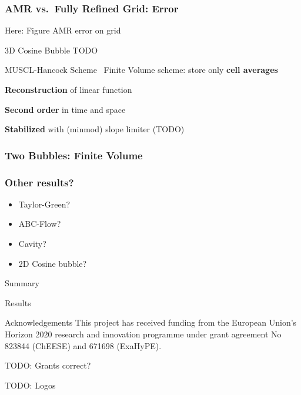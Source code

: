 \documentclass[aspectratio=169]{beamer}
\begin{document}
\begin{frame}
  \frametitle{AMR vs.\ Fully Refined Grid: Error}

  Here: Figure AMR error on grid
\end{frame}

\begin{frame}{3D Cosine Bubble}
  TODO
\end{frame}

\begin{frame}{MUSCL-Hancock Scheme~}
  Finite Volume scheme: store only \textbf{cell averages}

  \textbf{Reconstruction} of linear function

  \textbf{Second order} in time and space

  \textbf{Stabilized} with (minmod) slope limiter (TODO)
\end{frame}

\begin{frame}
  \frametitle{Two Bubbles: Finite Volume}
  
\end{frame}

\begin{frame}
  \frametitle{Other results?}
  \begin{itemize}
  \item Taylor-Green?
  \item ABC-Flow?
  \item Cavity?
  \item 2D Cosine bubble?
  \end{itemize}
\end{frame}

\begin{frame}{Summary}
  \begin{block}{Results}
  \end{block}
\end{frame}

\begin{frame}{Acknowledgements}
This project has received funding from the European Union's Horizon 2020 research and
innovation programme under grant agreement No 823844 (ChEESE) and 671698 (ExaHyPE).

TODO: Grants correct?

TODO: Logos
\end{frame}
\end{document}
